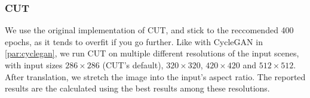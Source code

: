 	\subsubsection{CUT}
	\label{par:cut}
	We use the original implementation of CUT, and stick to the reccomended 400 epochs, as it tends to overfit if you go further. 
	Like with CycleGAN in \ref{par:cyclegan}, we run CUT on multiple different resolutions of the input scenes, with input sizes $286\times286$ (CUT's default), $320\times320$, $420\times420$ and $512\times512$. 
	After translation, we stretch the image into the input's aspect ratio.
	The reported results are the calculated using the best results among these resolutions.
	

	



